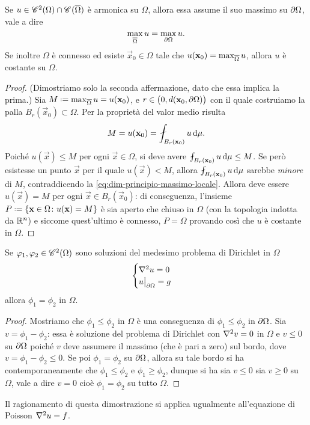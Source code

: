 \begin{teorema} \label{t:principio-massimo-laplace}
    Se $u\in\cont[2]{\Omega}\cap\cont{\clos{\Omega}}$ è armonica su $\Omega$, allora essa assume il suo massimo su $\boundary\Omega$, vale a dire
    \begin{equation}
        \max_{\clos{\Omega}}u=\max_{\boundary\Omega}u.
    \end{equation}
    Se inoltre $\Omega$ è connesso ed esiste $\vec x_0\in\Omega$ tale che $u(\vec x_0)=\max_{\clos{\Omega}}u$, allora $u$ è costante su $\Omega$.
\end{teorema}
\begin{proof}
    (Dimostriamo solo la seconda affermazione, dato che essa implica la prima.)
    Sia $M\defeq\max_{\clos{\Omega}}u=u(\vec x_0)$, e $r\in\bigl(0,d(\vec x_0,\boundary\Omega)\bigr)$ con il quale costruiamo la palla $B_r(\vec x_0)\subset\Omega$.
    Per la proprietà del valor medio risulta
    \begin{equation}
        M=u(\vec x_0)=\avint_{B_r(\vec x_0)}u\,\dd\mu.
        \label{eq:dim-principio-massimo-locale}
    \end{equation}
    Poich\'e $u(\vec x)\le M$ per ogni $\vec x\in\Omega$, si deve avere $\avint_{B_r(\vec x_0)}u\,\dd\mu\le M$.
    Se però esistesse un punto $\vec x$ per il quale $u(\vec x)<M$, allora $\avint_{B_r(\vec x_0)}u\,\dd\mu$ sarebbe \emph{minore} di $M$, contraddicendo la \eqref{eq:dim-principio-massimo-locale}.
    Allora deve essere $u(\vec x)=M$ per ogni $\vec x\in B_r(\vec x_0)$: di conseguenza, l'insieme $P\defeq\{\vec x\in\Omega\colon u(\vec x)=M\}$ è sia aperto che chiuso in $\Omega$ (con la topologia indotta da $\R^n$) e siccome quest'ultimo è connesso, $P=\Omega$ provando cos\`i che $u$ è costante in $\Omega$.
\end{proof}

\begin{teorema} \label{t:unicità-problema-dirichlet-laplace}
    Se $\phi_1,\phi_2\in\cont[2]{\Omega}$ sono soluzioni del medesimo problema di Dirichlet in $\Omega$
    \begin{equation}
        \begin{cases}
            \lap u=0 \\
            u\bigr|_{\boundary\Omega}=g
        \end{cases}
    \end{equation}
    allora $\phi_1=\phi_2$ in $\Omega$.
\end{teorema}
\begin{proof}
    Mostriamo che $\phi_1\le\phi_2$ in $\Omega$ è una conseguenza di $\phi_1\le\phi_2$ in $\boundary\Omega$.
    Sia $v=\phi_1-\phi_2$: essa è soluzione del problema di Dirichlet con $\lap v=0$ in $\Omega$ e $v\le 0$ su $\boundary\Omega$ poich\'e $v$ deve assumere il massimo (che è pari a zero) sul bordo, dove $v=\phi_1-\phi_2\le 0$.
    Se poi $\phi_1=\phi_2$ su $\boundary\Omega$, allora su tale bordo si ha contemporaneamente che $\phi_1\le\phi_2$ e $\phi_1\ge\phi_2$, dunque si ha sia $v\le 0$ sia $v\ge 0$ su $\Omega$, vale a dire $v=0$ cioè $\phi_1=\phi_2$ su tutto $\Omega$.
\end{proof}
Il ragionamento di questa dimostrazione si applica ugualmente all'equazione di Poisson $\lap u=f$.

